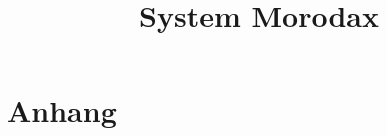 \documentclass[a4paper]{report}
\begin{document}



\title{System Morodax}


\tableofcontents\newpage






\part{Anhang}
\begin{Beispiele}
%


%
\end{Beispiele}
\begin{characterSheets}



\end{characterSheets}

\end{document}
